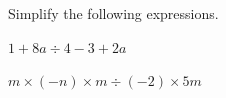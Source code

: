  Simplify the following expressions.

\begin{subparts}
  \item $1+8a\div 4-3+2a$
  \item $m\times(-n)\times m\div(-2)\times 5m$
\end{subparts}

